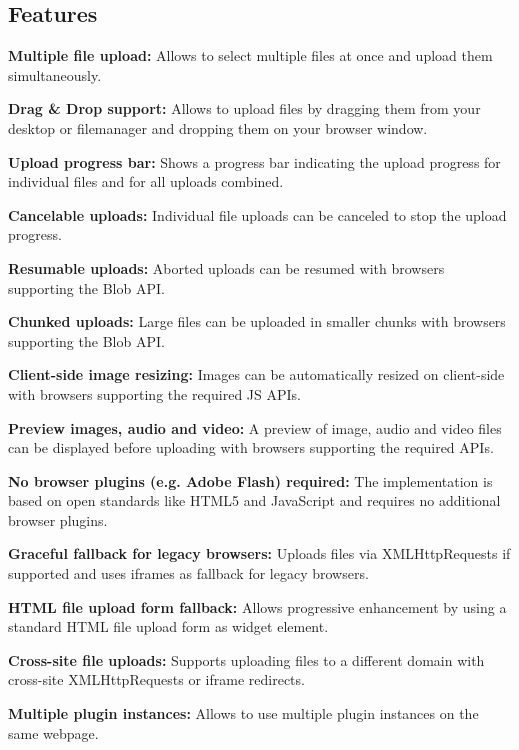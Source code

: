\subsection*{Features}


\begin{DoxyItemize}
\item {\bfseries Multiple file upload\-:} Allows to select multiple files at once and upload them simultaneously.
\item {\bfseries Drag \& Drop support\-:} Allows to upload files by dragging them from your desktop or filemanager and dropping them on your browser window.
\item {\bfseries Upload progress bar\-:} Shows a progress bar indicating the upload progress for individual files and for all uploads combined.
\item {\bfseries Cancelable uploads\-:} Individual file uploads can be canceled to stop the upload progress.
\item {\bfseries Resumable uploads\-:} Aborted uploads can be resumed with browsers supporting the Blob A\-P\-I.
\item {\bfseries Chunked uploads\-:} Large files can be uploaded in smaller chunks with browsers supporting the Blob A\-P\-I.
\item {\bfseries Client-\/side image resizing\-:} Images can be automatically resized on client-\/side with browsers supporting the required J\-S A\-P\-Is.
\item {\bfseries Preview images, audio and video\-:} A preview of image, audio and video files can be displayed before uploading with browsers supporting the required A\-P\-Is.
\item {\bfseries No browser plugins (e.\-g. Adobe Flash) required\-:} The implementation is based on open standards like H\-T\-M\-L5 and Java\-Script and requires no additional browser plugins.
\item {\bfseries Graceful fallback for legacy browsers\-:} Uploads files via X\-M\-L\-Http\-Requests if supported and uses iframes as fallback for legacy browsers.
\item {\bfseries H\-T\-M\-L file upload form fallback\-:} Allows progressive enhancement by using a standard H\-T\-M\-L file upload form as widget element.
\item {\bfseries Cross-\/site file uploads\-:} Supports uploading files to a different domain with cross-\/site X\-M\-L\-Http\-Requests or iframe redirects.
\item {\bfseries Multiple plugin instances\-:} Allows to use multiple plugin instances on the same webpage.

\end{DoxyItemize}
